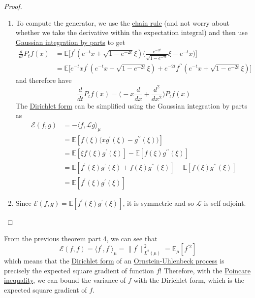 \begin{proof}
\begin{enumerate}
      \item To compute the generator, we use the \hyperref[mv-thm:chain-rule]{chain rule} (and not worry about whether we take the derivative within the expectation integral) and then use \hyperref[thm:gaussian-integration-by-parts]{Gaussian integration by parts} to get 
      \begin{align*}
          \frac{d}{dt} P_t f(x) & = \mathbb{E} \bigg[ f^\prime (e^{-t} x + \sqrt{1 - e^{-2t}} \xi) \bigg( \frac{e^{-2t}}{\sqrt{1 - e^{-2t}}} \xi - e^{-t} x \bigg) \bigg] \\
          & = \mathbb{E} \big[ e^{-t} x f^\prime (e^{-t} x + \sqrt{1 - e^{-2t}} \xi) + e^{-2t} f^{\prime\prime} (e^{-t} x + \sqrt{1 - e^{-2t}} \xi ) \big]
      \end{align*}
      and therefore have 
      \begin{equation}
        \frac{d}{dt} P_t f (x) = \bigg( -x \frac{d}{dx} + \frac{d^2}{dx^2} \bigg) P_t f (x)
      \end{equation}
      The \hyperref[def:dirichlet-form]{Dirichlet form} can be simplified using the Gaussian integration by parts as 
      \begin{align*}
          \mathcal{E} (f, g) & = - \langle f, \mathscr{L} g \rangle_\mu \\
          & = \mathbb{E}[ f(\xi) \big( x g^\prime (\xi) - g^{\prime\prime} (\xi) \big)] \\
          & = \mathbb{E}[\xi f(\xi) g^\prime(\xi)] - \mathbb{E}[f(\xi) g^{\prime\prime} (\xi)] \\
          & = \mathbb{E}[f^\prime (\xi) g^\prime (\xi) + f(\xi) g^{\prime\prime} (\xi)] - \mathbb{E}[f(\xi) g^{\prime\prime} (\xi)] \\
          & = \mathbb{E}[f^\prime (\xi) g^\prime (\xi) ]
      \end{align*} 
      
      \item Since $\mathcal{E}(f, g) = \mathbb{E}[f^\prime(\xi) g^\prime (\xi)]$, it is symmetric and so $\mathscr{L}$ is self-adjoint. 
  \end{enumerate}

  \end{proof}

  From the previous theorem part 4, we can see that 
  \begin{equation}
    \mathcal{E}(f, f) = \langle f^\prime, f^\prime \rangle_\mu = \|f^\prime\|_{L^2(\mu)}^2 = \mathbb{E}_\mu[ f^{\prime 2} ]
  \end{equation}
  which means that the \hyperref[def:dirichlet-form]{Dirichlet form} of an \hyperref[def:ornstein-uhlenbeck-process]{Ornstein-Uhlenbeck process} is precisely the expected square gradient of function $f$! Therefore, with the \hyperref[thm:poincare-inequality]{Poincare inequality}, we can bound the variance of $f$ with the Dirichlet form, which is the expected square gradient of $f$. 

